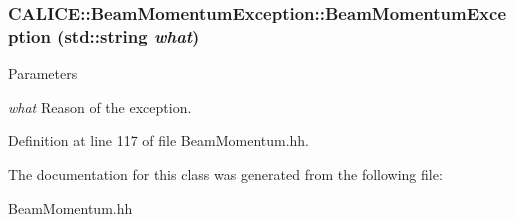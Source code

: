 \subsubsection[{BeamMomentumException}]{\setlength{\rightskip}{0pt plus 5cm}CALICE::BeamMomentumException::BeamMomentumException (std::string {\em what})\hspace{0.3cm}{\ttfamily  [inline]}}\label{classCALICE_1_1BeamMomentumException_abbab9053af44936a75964dfafd1824ed}

\begin{DoxyParams}{Parameters}
\item[{\em what}]Reason of the exception. \end{DoxyParams}


Definition at line 117 of file BeamMomentum.hh.

The documentation for this class was generated from the following file:\begin{DoxyCompactItemize}
\item 
BeamMomentum.hh\end{DoxyCompactItemize}
